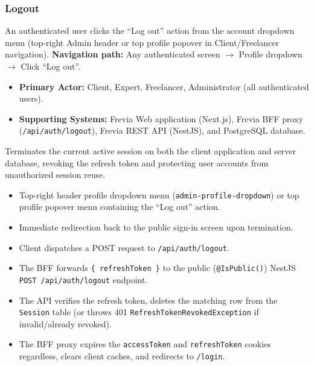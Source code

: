 \subsubsection{ Logout}

An authenticated user clicks the ``Log out'' action from the account dropdown menu (top-right Admin header or top profile popover in Client/Freelancer navigation).\newline
\textbf{Navigation path:} Any authenticated screen $\rightarrow$ Profile dropdown $\rightarrow$ Click ``Log out''.


\begin{itemize}[leftmargin=1.6em,topsep=3pt,itemsep=2pt,parsep=0pt,label=$\bullet$]
    \item \textbf{Primary Actor:} Client, Expert, Freelancer, Administrator (all authenticated users).
    \item \textbf{Supporting Systems:} Frevia Web application (Next.js), Frevia BFF proxy (\texttt{/api/auth/logout}), Frevia REST API (NestJS), and PostgreSQL database.
\end{itemize}

\noindent Terminates the current active session on both the client application and server database, revoking the refresh token and protecting user accounts from unauthorized session reuse.

\begin{itemize}[leftmargin=1.6em,topsep=3pt,itemsep=2pt,parsep=0pt,label=$\bullet$]
    \item Top-right header profile dropdown menu (\texttt{admin-profile-dropdown}) or top profile popover menu containing the ``Log out'' action.
    \item Immediate redirection back to the public sign-in screen upon termination.
\end{itemize}

\begin{itemize}[leftmargin=1.6em,topsep=3pt,itemsep=2pt,parsep=0pt,label=$\bullet$]
    \item Client dispatches a POST request to \texttt{/api/auth/logout}.
    \item The BFF forwards \texttt{\{ refreshToken \}} to the public (\texttt{@IsPublic()}) NestJS \texttt{POST /api/auth/logout} endpoint.
    \item The API verifies the refresh token, deletes the matching row from the \texttt{Session} table (or throws 401 \texttt{RefreshTokenRevokedException} if invalid/already revoked).
    \item The BFF proxy expires the \texttt{accessToken} and \texttt{refreshToken} cookies regardless, clears client caches, and redirects to \texttt{/login}.
\end{itemize}

